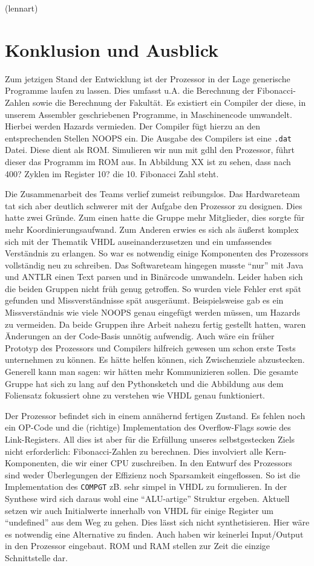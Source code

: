\documentclass[paper=a4,fontsize=12pt,twocolumn]{scrreprt}
\begin{document}
(lennart)

\chapter{Konklusion und Ausblick}
Zum jetzigen Stand der Entwicklung ist der Prozessor in der Lage generische Programme laufen zu lassen.
Dies umfasst u.A. die Berechnung der Fibonacci-Zahlen sowie die Berechnung der Fakultät.
Es existiert ein Compiler der diese, in unserem Assembler geschriebenen Programme, in Maschinencode umwandelt.
Hierbei werden Hazards vermieden.
Der Compiler fügt hierzu an den entsprechenden Stellen NOOPS ein.
Die Ausgabe des Compilers ist eine \texttt{.dat} Datei.
Diese dient als ROM.
Simulieren wir nun mit gdhl den Prozessor, führt dieser das Programm im ROM aus.
In Abbildung XX ist zu sehen, dass nach 400? Zyklen im Register 10? die 10. Fibonacci Zahl steht.

Die Zusammenarbeit des Teams verlief zumeist reibungslos.
Das Hardwareteam tat sich aber deutlich schwerer mit der Aufgabe den Prozessor zu designen.
Dies hatte zwei Gründe.
Zum einen hatte die Gruppe mehr Mitglieder, dies sorgte für mehr Koordinierungsaufwand.
Zum Anderen erwies es sich als äußerst komplex sich mit der Thematik VHDL auseinanderzusetzen und ein umfassendes Verständnis zu erlangen.
So war es notwendig einige Komponenten des Prozessors vollständig neu zu schreiben.
Das Softwareteam hingegen musste \enquote{nur} mit Java und ANTLR einen Text parsen und in Binärcode umwandeln. 
Leider haben sich die beiden Gruppen nicht früh genug getroffen.
So wurden viele Fehler erst spät gefunden und Missverständnisse spät ausgeräumt.
Beispielsweise gab es ein Missverständnis wie viele NOOPS genau eingefügt werden müssen, um Hazards zu vermeiden.
Da beide Gruppen ihre Arbeit nahezu fertig gestellt hatten, waren Änderungen an der Code-Basis unnötig aufwendig.
Auch wäre ein früher Prototyp des Prozessors und Compilers hilfreich gewesen um schon erste Tests unternehmen zu können.
Es hätte helfen können, sich Zwischenziele abzustecken.
Generell kann man sagen: wir hätten mehr Kommunizieren sollen.
Die gesamte Gruppe hat sich zu lang auf den Pythonsketch und die Abbildung aus dem Foliensatz fokussiert ohne zu verstehen wie VHDL genau funktioniert.

Der Prozessor befindet sich in einem annähernd fertigen Zustand.
Es fehlen noch ein OP-Code und die (richtige) Implementation des Overflow-Flags sowie des Link-Registers.
All dies ist aber für die Erfüllung unseres selbstgestecken Ziels nicht erforderlich: Fibonacci-Zahlen zu berechnen.
Dies involviert alle Kern-Komponenten, die wir einer CPU zuschreiben.
In den Entwurf des Prozessors sind weder Überlegungen der Effizienz noch Sparsamkeit eingeflossen.
So ist die Implementation des \texttt{COMPGT} zB. sehr simpel in VHDL zu formulieren.
In der Synthese wird sich daraus wohl eine \enquote{ALU-artige} Struktur ergeben.
Aktuell setzen wir auch Initialwerte innerhalb von VHDL für einige Register um \enquote{undefined} aus dem Weg zu gehen.
Dies lässt sich nicht synthetisieren.
Hier wäre es notwendig eine Alternative zu finden.
Auch haben wir keinerlei Input/Output in den Prozessor eingebaut.
ROM und RAM stellen zur Zeit die einzige Schnittstelle dar.
\end{document}
